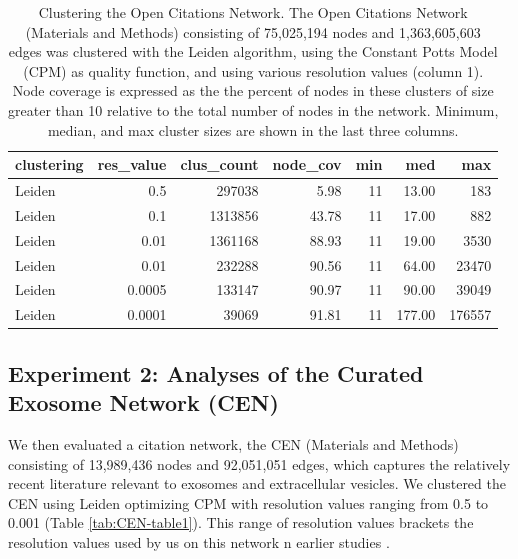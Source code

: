 \documentclass[11pt]{article}   	%
\begin{document}
\begin{table}[H]
\centering
\begin{tabular}{lrrrrrr}
  \hline
 clustering & res\_value & clus\_count & node\_cov & min & med & max \\
  \hline
Leiden & 0.5 & 297038 & 5.98 &  11 & 13.00 & 183 \\
Leiden & 0.1 & 1313856 & 43.78 &  11 & 17.00 & 882 \\
Leiden & 0.01 & 1361168 & 88.93 &  11 & 19.00 & 3530 \\
Leiden & 0.01 & 232288 & 90.56 &  11 & 64.00 & 23470 \\
Leiden & 0.0005 & 133147 & 90.97 &  11 & 90.00 & 39049 \\
Leiden & 0.0001 & 39069 & 91.81 &  11 & 177.00 & 176557 \\
   \hline
\end{tabular}
\caption{Clustering the Open Citations Network. The Open Citations Network (Materials and Methods) consisting of 75,025,194 nodes and 1,363,605,603 edges was clustered with the Leiden algorithm, using the Constant Potts Model (CPM) as quality function, and using various resolution values (column 1). Node coverage is expressed as the the percent of nodes in these clusters of size greater than 10 relative to the total number of nodes in the network. Minimum, median, and max cluster sizes are shown in the last three columns.  }
\end{table}


\subsection{Experiment 2: Analyses of the Curated Exosome Network (CEN)}

We then evaluated a citation network, the CEN (Materials and Methods) consisting of 13,989,436 nodes and 92,051,051 edges, which captures the relatively recent literature relevant to exosomes and extracellular vesicles. We clustered the CEN using Leiden optimizing CPM with resolution values ranging from 0.5 to 0.001 (Table \ref{tab:CEN-table1}). This range of resolution values brackets the resolution values used by us on this network n earlier studies \citep{Wedell2022,Jakatdar_2022}.
\end{document}
